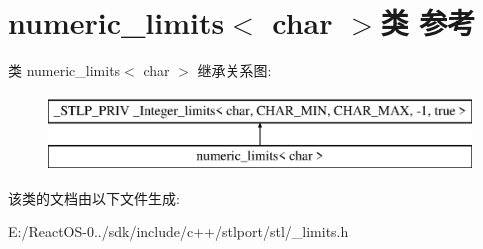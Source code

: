 \hypertarget{classnumeric__limits_3_01char_01_4}{}\section{numeric\+\_\+limits$<$ char $>$类 参考}
\label{classnumeric__limits_3_01char_01_4}
类 numeric\+\_\+limits$<$ char $>$ 继承关系图\+:\begin{figure}[H]
\begin{center}
\leavevmode
\includegraphics[height=2.000000cm]{classnumeric__limits_3_01char_01_4}
\end{center}
\end{figure}


该类的文档由以下文件生成\+:\begin{DoxyCompactItemize}
\item 
E\+:/\+React\+O\+S-\/0../sdk/include/c++/stlport/stl/\+\_\+limits.\+h\end{DoxyCompactItemize}
